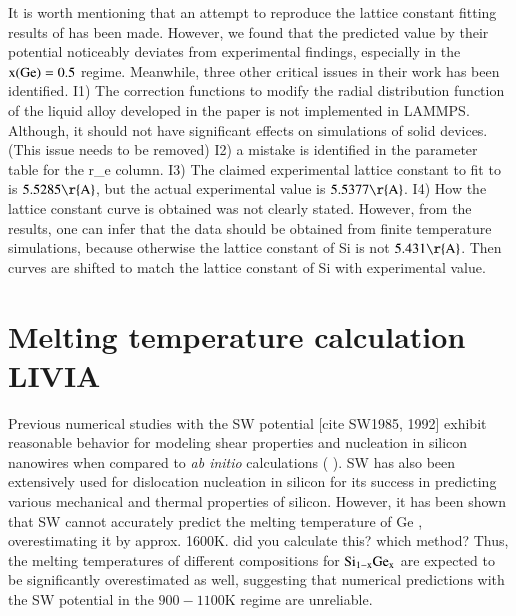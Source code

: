 \documentclass[review]{elsarticle}
\begin{document}
It is worth mentioning that an attempt to reproduce the lattice constant fitting results of \cite{grochola2010modified} has been made. However, we found that the predicted value by their potential noticeably deviates from experimental findings, especially in the ${\rm x(Ge)=0.5}$ regime. Meanwhile,  three other critical issues in their work has been identified. I1) The correction functions to modify the radial distribution function of the liquid alloy developed in the paper is not implemented in LAMMPS. Although, it should not have significant effects on simulations of solid devices. ({\color{red}This issue needs to be removed})
I2) a mistake is identified in the parameter table for the r\_e column. 
I3) The claimed experimental lattice constant to fit to is $5.5285 {\rm \r{A}}$, but the actual experimental value is $5.5377 {\rm \r{A}}$. 
I4) How the lattice constant curve is obtained was not clearly stated. However, from the results, one can infer that the data should be obtained from finite temperature simulations, because otherwise the lattice constant of Si is not $5.431 {\rm \r{A}}$. Then  curves are shifted to match the lattice constant of Si with experimental value. 


\section{Melting temperature calculation {\color{red} LIVIA}}
\label{sec:melting_temperature}

%
Previous numerical studies with the SW potential  [cite SW1985, 1992] exhibit reasonable behavior for modeling shear properties and nucleation in silicon nanowires when compared to {\it ab initio} calculations (\cite{godet2009evidence} \cite{pizzagalli2013new}). SW has also been extensively used for dislocation nucleation in silicon for its success in predicting various mechanical and thermal properties of silicon.  However, it has been shown that SW cannot accurately predict the melting temperature of Ge \cite{ryu2008comparison}, overestimating it by approx. 1600K. {\color{red} did you calculate this? which method?} Thus, the melting temperatures of different compositions for $\rm Si_{1-x} Ge_x$ are expected to be significantly overestimated as well, suggesting that numerical predictions with the SW potential in the $900-1100$K regime are unreliable. 

%
\end{document}
